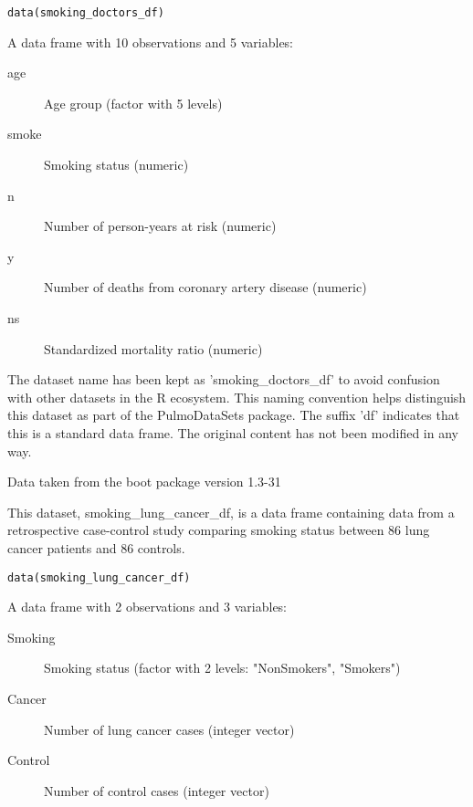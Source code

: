\documentclass[a4paper]{book}
\begin{document}
%
\begin{Usage}
\begin{verbatim}
data(smoking_doctors_df)
\end{verbatim}
\end{Usage}
%
\begin{Format}
A data frame with 10 observations and 5 variables:
\begin{description}

\item[age] Age group (factor with 5 levels)
\item[smoke] Smoking status (numeric)
\item[n] Number of person-years at risk (numeric)
\item[y] Number of deaths from coronary artery disease (numeric)
\item[ns] Standardized mortality ratio (numeric)

\end{description}

\end{Format}
%
\begin{Details}
The dataset name has been kept as 'smoking\_doctors\_df' to avoid confusion with other
datasets in the R ecosystem. This naming convention helps distinguish this dataset
as part of the PulmoDataSets package. The suffix 'df' indicates that this is a
standard data frame. The original content has not been modified in any way.
\end{Details}
%
\begin{Source}
Data taken from the boot package version 1.3-31
\end{Source}
%
\begin{Description}
This dataset, smoking\_lung\_cancer\_df, is a data frame containing data from a retrospective
case-control study comparing smoking status between 86 lung cancer patients and 86 controls.
\end{Description}
%
\begin{Usage}
\begin{verbatim}
data(smoking_lung_cancer_df)
\end{verbatim}
\end{Usage}
%
\begin{Format}
A data frame with 2 observations and 3 variables:
\begin{description}

\item[Smoking] Smoking status (factor with 2 levels: "NonSmokers", "Smokers")
\item[Cancer] Number of lung cancer cases (integer vector)
\item[Control] Number of control cases (integer vector)

\end{description}

\end{Format}
\end{document}
